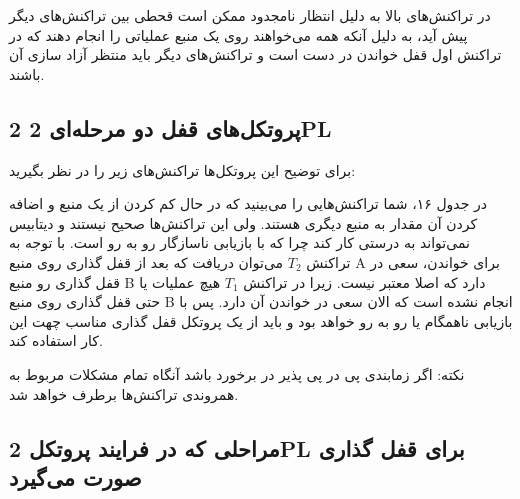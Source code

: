 \documentclass[a4paper]{article}
\begin{document}
در تراکنش‌های بالا به دلیل انتظار نامجدود ممکن است قحطی بین تراکنش‌های دیگر پیش
آید، به دلیل آنکه همه می‌خواهند روی یک منبع عملیاتی را انجام دهند که در تراکنش
اول قفل خواندن در دست است و تراکنش‌های دیگر باید منتظر آزاد سازی آن باشند.

\subsection{پروتکل‌های قفل دو مرحله‌ای 2 2PL}

برای توضیح این پروتکل‌ها تراکنش‌های زیر را در نظر بگیرید:

\begin{LTR}
    \begin{table}[h]
        \begin{RTL}
            \caption{زمانبندی $S_{5}$}
        \end{RTL}
        \centering
    \end{table}
\end{LTR}

در جدول ۱۶، شما تراکنش‌هایی را می‌بینید که در حال کم کردن از یک منبع و اضافه
کردن آن مقدار به منبع دیگری هستند. ولی این تراکنش‌ها صحیح نیستند و دیتابیس
نمی‌تواند به درستی کار کند چرا که با بازیابی ناسازگار رو به رو است. با توجه به
تراکنش $T_{2}$ می‌توان دریافت که بعد از قفل گذاری روی منبع A برای خواندن، سعی در
قفل گذاری رو منبع B دارد که اصلا معتبر نیست. زیرا در تراکنش $T_{1}$ هیچ عملیات
یا حتی قفل گذاری روی منبع B انجام نشده است که الان سعی در خواندن آن دارد. پس با
بازیابی ناهمگام یا  رو به رو خواهد بود و باید از یک
پروتکل قفل گذاری مناسب چهت این کار استفاده کند.

نکته: اگر زمابندی پی در پی پذیر در برخورد باشد آنگاه تمام مشکلات مربوط به
همروندی تراکنش‌ها برطرف خواهد شد.

\subsection{مراحلی که در فرایند پروتکل 2PL برای قفل گذاری صورت می‌گیرد}
\end{document}
